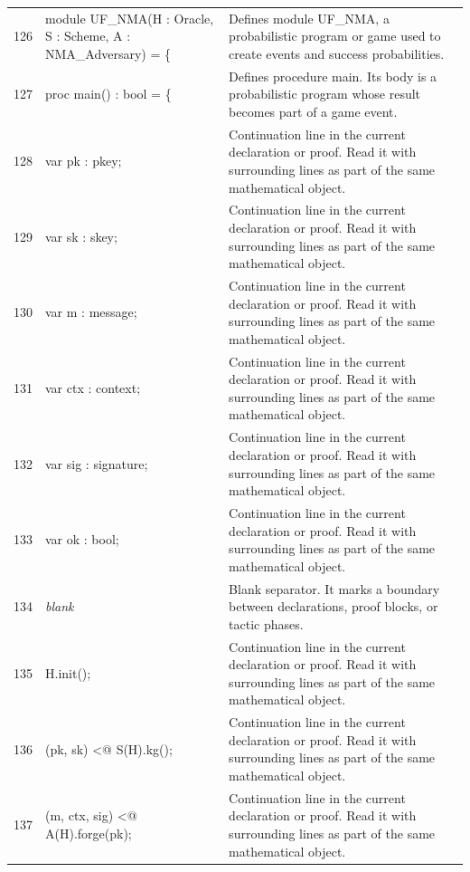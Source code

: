 \documentclass[10pt]{article}
\begin{document}
\begin{longtable}{r L{0.53\textwidth} L{0.37\textwidth}}
126 & {\ttfamily\scriptsize module UF\_NMA(H : Oracle, S : Scheme, A : NMA\_Adversary) = \{} & Defines module UF\_NMA, a probabilistic program or game used to create events and success probabilities. \\
127 & {\ttfamily\scriptsize   proc main() : bool = \{} & Defines procedure main.  Its body is a probabilistic program whose result becomes part of a game event. \\
128 & {\ttfamily\scriptsize     var pk : pkey;} & Continuation line in the current declaration or proof.  Read it with surrounding lines as part of the same mathematical object. \\
129 & {\ttfamily\scriptsize     var sk : skey;} & Continuation line in the current declaration or proof.  Read it with surrounding lines as part of the same mathematical object. \\
130 & {\ttfamily\scriptsize     var m : message;} & Continuation line in the current declaration or proof.  Read it with surrounding lines as part of the same mathematical object. \\
131 & {\ttfamily\scriptsize     var ctx : context;} & Continuation line in the current declaration or proof.  Read it with surrounding lines as part of the same mathematical object. \\
132 & {\ttfamily\scriptsize     var sig : signature;} & Continuation line in the current declaration or proof.  Read it with surrounding lines as part of the same mathematical object. \\
133 & {\ttfamily\scriptsize     var ok : bool;} & Continuation line in the current declaration or proof.  Read it with surrounding lines as part of the same mathematical object. \\
134 & {\ttfamily\scriptsize \emph{blank}} & Blank separator.  It marks a boundary between declarations, proof blocks, or tactic phases. \\
135 & {\ttfamily\scriptsize     H.init();} & Continuation line in the current declaration or proof.  Read it with surrounding lines as part of the same mathematical object. \\
136 & {\ttfamily\scriptsize     (pk, sk) <@ S(H).kg();} & Continuation line in the current declaration or proof.  Read it with surrounding lines as part of the same mathematical object. \\
137 & {\ttfamily\scriptsize     (m, ctx, sig) <@ A(H).forge(pk);} & Continuation line in the current declaration or proof.  Read it with surrounding lines as part of the same mathematical object. \\

\end{longtable}
\end{document}

